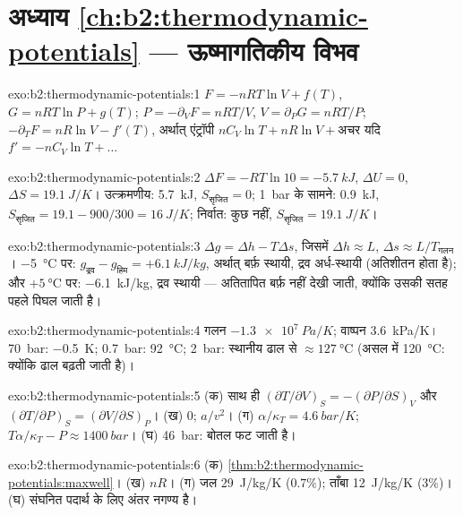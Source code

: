 \section*{अध्याय \ref{ch:b2:thermodynamic-potentials} --- ऊष्मागतिकीय विभव}

\begin{solution}{exo:b2:thermodynamic-potentials:1}
$F = -nRT\ln V + f(T)$, $G = nRT\ln P + g(T)$; $P = -\partial_VF = nRT/V$,
$V = \partial_PG = nRT/P$; $-\partial_TF = nR\ln V - f'(T)$, अर्थात् एंट्रॉपी
$nC_V\ln T + nR\ln V + \text{अचर}$ यदि $f' = -nC_V\ln T + \dots$
\end{solution}

\begin{solution}{exo:b2:thermodynamic-potentials:2}
$\Delta F = -RT\ln 10 = \qty{-5.7}{kJ}$, $\Delta U = 0$, $\Delta S = \qty{19.1}{J/K}$।
उत्क्रमणीय: \qty{5.7}{kJ}, $S_{\text{सृजित}} = 0$; \qty{1}{bar} के सामने: \qty{0.9}{kJ},
$S_{\text{सृजित}} = 19.1 - 900/300 = \qty{16}{J/K}$; निर्वात: कुछ नहीं, $S_{\text{सृजित}} =
\qty{19.1}{J/K}$।
\end{solution}

\begin{solution}{exo:b2:thermodynamic-potentials:3}
$\Delta g = \Delta h - T\Delta s$, जिसमें $\Delta h \approx L$, $\Delta s \approx L/T_{\text{गलन}}$।
\qty{-5}{\celsius} पर: $g_{\text{द्रव}} - g_{\text{हिम}} = +\qty{6.1}{kJ/kg}$, अर्थात् बर्फ़
स्थायी, द्रव अर्ध-स्थायी (अतिशीतन होता है); और $+\qty{5}{\celsius}$ पर:
\qty{-6.1}{kJ/kg}, द्रव स्थायी --- अतितापित बर्फ़ नहीं देखी जाती, क्योंकि उसकी
सतह पहले पिघल जाती है।
\end{solution}

\begin{solution}{exo:b2:thermodynamic-potentials:4}
गलन $\qty{-1.3e7}{Pa/K}$; वाष्पन \qty{3.6}{kPa/K}। \qty{70}{bar}:
\qty{-0.5}{K}; \qty{0.7}{bar}: \qty{92}{\celsius}; \qty{2}{bar}: स्थानीय ढाल से $\approx
\qty{127}{\celsius}$ (असल में \qty{120}{\celsius}: क्योंकि
ढाल बढ़ती जाती है)।
\end{solution}

\begin{solution}{exo:b2:thermodynamic-potentials:5}
(क) साथ ही $(\partial T/\partial V)_S = -(\partial P/\partial S)_V$ और
$(\partial T/\partial P)_S = (\partial V/\partial S)_P$। (ख) $0$; $a/v^2$। (ग)
$\alpha/\kappa_T = \qty{4.6}{bar/K}$; $T\alpha/\kappa_T - P \approx \qty{1400}{bar}$।
(घ) \qty{46}{bar}: बोतल फट जाती है।
\end{solution}

\begin{solution}{exo:b2:thermodynamic-potentials:6}
(क) \cref{thm:b2:thermodynamic-potentials:maxwell}। (ख) $nR$। (ग) जल
\qty{29}{J/kg/K} ($0.7\%$); ताँबा \qty{12}{J/kg/K} ($3\%$)। (घ) संघनित पदार्थ के लिए
अंतर नगण्य है।
\end{solution}

